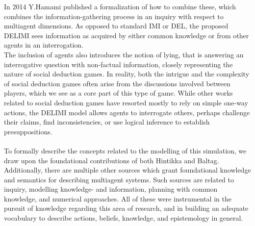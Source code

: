 In 2014 Y.Hamami\cite{delimi} published a formalization of how to combine
these, which combines the information-gathering process in an inquiry with
respect to multiagent dimensions. As opposed to standard IMI or DEL, the
proposed DELIMI sees information as acquired by either common knowledge or from
other agents in an interrogation. \\ The inclusion of agents also introduces
the notion of lying, that is answering an interrogative question with
non-factual information, closely representing the nature of social deduction
games. In reality, both the intrigue and the complexity of social deduction
games often arise from the discussions involved between players, which we see
as a core part of this type of game. While other works related to social
deduction games have resorted mostly to rely on simple one-way actions, the
DELIMI model allows agents to interrogate others, perhaps challenge their
claims, find inconsistencies, or use logical inference to establish
presuppositions.\\ \\ To formally describe the concepts related to the
modelling of this simulation, we draw upon the foundational contributions of
both Hintikka\cite{hintikka} and Baltag\cite{Baltag}. Additionally, there are
multiple other sources which grant foundational knowledge and semantics for
describing multiagent systems. Such sources are related to
inquiry\cite{delimi}, modelling knowledge- and
information\cite{modelling_multi_agent_epistemic_systems}, planning with common
knowledge\cite{multi_agent_epistemic_planner_common_knowledge}, and
numerical approaches\cite{probibalistic_multiagent_systems}. All of these
were instrumental in the pursuit of knowledge regarding this area of research,
and in building an adequate vocabulary to describe actions, beliefs, knowledge,
and epistemology in general.